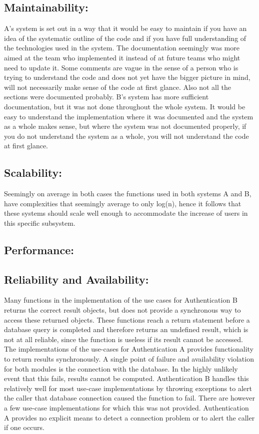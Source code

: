 \subsection{Maintainability:}
A's system is set out in a way that it would be easy to maintain if you have an idea of the systematic outline of the code and if you have full understanding of the technologies used in the system. The documentation seemingly was more aimed at the team who implemented it instead of at future teams who might need to update it. Some comments are vague in the sense of a person who is trying to understand the code and does not yet have the bigger picture in mind, will not necessarily make sense of the code at first glance. Also not all the sections were documented probably.
B's system has more sufficient documentation, but it was not done throughout the whole system. It would be easy to understand the implementation where it was documented and the system as a whole makes sense, but where the system was not documented properly, if you do not understand the system as a whole, you will not understand the code at first glance. 

\subsection{Scalability:}
Seemingly on average in both cases the functions used in both systems A and B, have complexities that seemingly average to only log(n), hence it follows that these systems should scale well enough to accommodate the increase of users in this specific subsystem. 

\subsection{Performance:}

\subsection{Reliability and Availability:}
Many functions in the implementation of the use cases for Authentication B returns the correct result objects, but does not provide a synchronous way to access these returned objects. These functions reach a return statement before a database query is completed and therefore returns an undefined result, which is not at all reliable, since the function is useless if its result cannot be accessed. 
The implementations of the use-cases for Authentication A provides functionality to return results synchronously.
A single point of failure and availability violation for both modules is the connection with the database. In the highly unlikely event that this fails, results cannot be computed. Authentication B handles this relatively well for most use-case implementations by throwing exceptions to alert the caller that database connection caused the function to fail. There are however a few use-case implementations for which this was not provided. Authentication A provides no explicit means to detect a connection problem or to alert the caller if one occurs.

